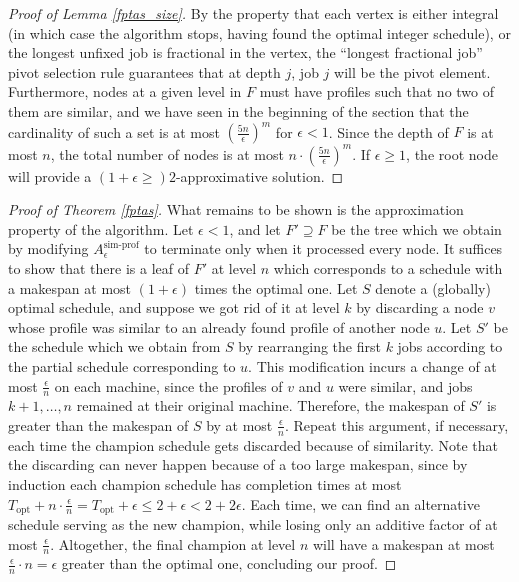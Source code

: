 \documentclass[a4paper,UKenglish,cleveref, autoref, thm-restate, pdfa]{lipics-v2021}
\theoremstyle{plain}
\begin{document}
\begin{proof}[Proof of Lemma \ref{fptas_size}]
    By the property that each vertex is either integral (in which case the algorithm stops, having found the optimal integer schedule), or the longest unfixed job is fractional in the vertex, the ``longest fractional job'' pivot selection rule guarantees that at depth $j$, job $j$ will be the pivot element. Furthermore, nodes at a given level in $F$ must have profiles such that no two of them are similar, and we have seen in the beginning of the section that the cardinality of such a set is at most $\left(\frac{5n}{\epsilon}\right)^m$ for $\epsilon < 1$. Since the depth of $F$ is at most $n$, the total number of nodes is at most $n\cdot\left(\frac{5n}{\epsilon}\right)^m$. If $\epsilon \ge 1$, the root node will provide a $(1+\epsilon \ge )2$-approximative solution.
\end{proof}

\begin{proof}[Proof of Theorem \ref{fptas}]
    What remains to be shown is the approximation property of the algorithm. Let $\epsilon<1$, and let $F' \supseteq F$ be the tree which we obtain by modifying $A^{\text{sim-prof}}_{\epsilon}$ to terminate only when it processed every node. It suffices to show that there is a leaf of $F'$ at level $n$ which corresponds to a schedule with a makespan at most $(1+\epsilon)$ times the optimal one. Let $S$ denote a (globally) optimal schedule, and suppose we got rid of it at level $k$ by discarding a node $v$ whose profile was similar to an already found profile of another node $u$. Let $S'$ be the schedule which we obtain from $S$ by rearranging the first $k$ jobs according to the partial schedule corresponding to $u$. This modification incurs a change of at most $\frac{\epsilon}{n}$ on each machine, since the profiles of $v$ and $u$ were similar, and jobs $k+1, \ldots, n$ remained at their original machine. Therefore, the makespan of $S'$ is greater than the makespan of $S$ by at most $\frac{\epsilon}{n}$. Repeat this argument, if necessary, each time the champion schedule gets discarded because of similarity. Note that the discarding can never happen because of a too large makespan, since by induction each champion schedule has completion times at most $T_{\text{opt}} + n\cdot\frac{\epsilon}{n} = T_{\text{opt}} + \epsilon \le 2 + \epsilon < 2 + 2\epsilon$. Each time, we can find an alternative schedule serving as the new champion, while losing only an additive factor of at most $\frac{\epsilon}{n}$. Altogether, the final champion at level $n$ will have a makespan at most $\frac{\epsilon}{n} \cdot n = \epsilon$ greater than the optimal one, concluding our proof.
\end{proof}
\end{document}
